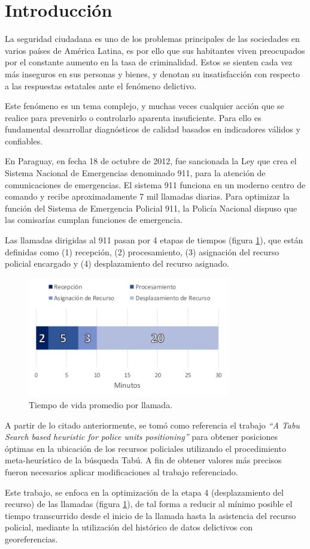 \section{Introducción}
La seguridad ciudadana es uno de los problemas principales de las sociedades en varios países de América Latina, es por ello que sus habitantes viven preocupados por el constante aumento en la tasa de criminalidad. Estos se sienten cada vez más inseguros en sus personas y bienes, y denotan su insatisfacción con respecto a las respuestas estatales ante el fenómeno delictivo\cite{rico2002seguridad}.

Este fenómeno es un tema complejo, y muchas veces cualquier acción que se realice para prevenirlo o controlarlo aparenta insuficiente. Para ello es fundamental desarrollar diagnósticos de calidad basados en indicadores válidos y confiables.

En Paraguay, en fecha 18 de octubre de 2012, fue sancionada la Ley que crea el Sistema Nacional de Emergencias denominado 911, para la atención de comunicaciones de emergencias. El sistema 911 funciona en un moderno centro de comando y recibe aproximadamente 7 mil llamadas diarias\cite{ensc2014}. Para optimizar la función del Sistema de Emergencia Policial 911, la Policía Nacional dispuso que las comisarías cumplan funciones de emergencia.

Las llamadas dirigidas al 911 pasan por 4 etapas de tiempos (figura \ref{fig:time1}), que están definidas como (1) recepción, (2) procesamiento, (3) asignación del recurso policial encargado y (4) desplazamiento del recurso asignado.

\begin{figure}[!ht]
    \centering
    \includegraphics[width=88mm,scale=0.5]{images/tiempo_llamadas.png}
    \caption{Tiempo de vida promedio por llamada.}
    \label{fig:time1}
\end{figure}

A partir de lo citado anteriormente, se tomó como referencia el trabajo \textit{``A Tabu Search based heuristic for police units positioning''}\cite{7359471} para obtener posiciones óptimas en la ubicación de los recursos policiales utilizando el procedimiento meta-heurístico de la búsqueda Tabú. A fin de obtener valores más precisos fueron necesarios aplicar modificaciones al trabajo referenciado.

Este trabajo, se enfoca en la optimización de la etapa 4 (desplazamiento del recurso) de las llamadas (figura \ref{fig:time1}), de tal forma a reducir al mínimo posible el tiempo transcurrido desde el inicio de la llamada hasta la asistencia del recurso policial, mediante la utilización del histórico de datos delictivos con georeferencias.